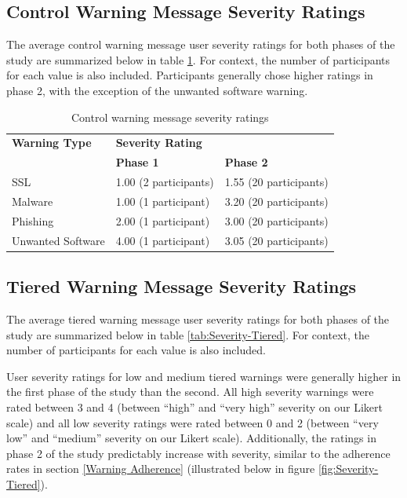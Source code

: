 \subsection{Control Warning Message Severity Ratings}
The average control warning message user severity ratings for both phases of the study are summarized below in table \ref{tab:Severity-Control}. For context, the number of participants for each value is also included. Participants generally chose higher ratings in phase 2, with the exception of the unwanted software warning.

{\renewcommand{\arraystretch}{1.2}
\begin{table}[!htb]
	\small
	\centering
	\begin{tabularx}{0.85\textwidth}{|l|X|X|}
		\hline			
		\textbf{Warning Type} & \multicolumn{2}{|X|}{\textbf{Severity Rating}}\\
		\cline{2-3}
		& \textbf{Phase 1} & \textbf{Phase 2}\\
		\hline
		SSL & 1.00 (2 participants) & 1.55 (20 participants)\\
		\hline
		Malware & 1.00 (1 participant) & 3.20 (20 participants)\\
		\hline
		Phishing & 2.00 (1 participant) & 3.00 (20 participants)\\
		\hline
		Unwanted Software & 4.00 (1 participant) & 3.05 (20 participants)\\
		\hline
	\end{tabularx}
	\caption{Control warning message severity ratings}
	\label{tab:Severity-Control}
\end{table}}

\subsection{Tiered Warning Message Severity Ratings}
The average tiered warning message user severity ratings for both phases of the study are summarized below in table \ref{tab:Severity-Tiered}. For context, the number of participants for each value is also included.

User severity ratings for low and medium tiered warnings were generally higher in the first phase of the study than the second. All high severity warnings were rated between 3 and 4 (between ``high'' and ``very high'' severity on our Likert scale) and all low severity ratings were rated between 0 and 2 (between ``very low'' and ``medium'' severity on our Likert scale). Additionally, the ratings in phase 2 of the study predictably increase with severity, similar to the adherence rates in section \ref{Warning Adherence} (illustrated below in figure \ref{fig:Severity-Tiered}).

